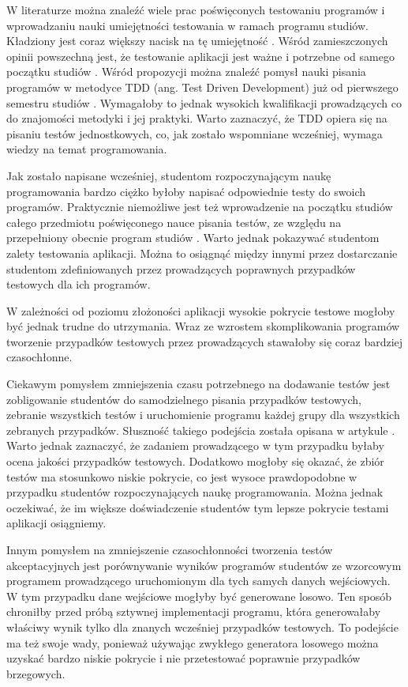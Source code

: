 W literaturze można znaleźć wiele prac poświęconych testowaniu programów i wprowadzaniu nauki umiejętności testowania w ramach programu studiów.
Kładziony jest coraz większy nacisk na tę umiejętność \cite{tests-important}.
Wśród zamieszczonych opinii powszechną jest, że testowanie aplikacji jest ważne i potrzebne od samego początku studiów \cite{test-from-scratch}.
Wśród propozycji można znaleźć pomysł nauki pisania programów w metodyce TDD (ang. Test Driven Development) już od pierwszego semestru studiów \cite{tdd-on-start}.
Wymagałoby to jednak wysokich kwalifikacji prowadzących co do znajomości metodyki i jej praktyki.
Warto zaznaczyć, że TDD opiera się na pisaniu testów jednostkowych, co, jak zostało wspomniane wcześniej, wymaga wiedzy na temat programowania.

Jak zostało napisane wcześniej, studentom rozpoczynającym naukę programowania bardzo ciężko byłoby napisać odpowiednie testy do swoich programów.
Praktycznie niemożliwe jest też wprowadzenie na początku studiów całego przedmiotu poświęconego nauce pisania testów, ze względu na przepełniony obecnie program studiów \cite{overflow-studies-program}.
Warto jednak pokazywać studentom zalety testowania aplikacji.
Można to osiągnąć między innymi przez dostarczanie studentom zdefiniowanych przez prowadzących poprawnych przypadków testowych dla ich programów.

W zależności od poziomu złożoności aplikacji wysokie pokrycie testowe mogłoby być jednak trudne do utrzymania.
Wraz ze wzrostem skomplikowania programów tworzenie przypadków testowych przez prowadzących stawałoby się coraz bardziej czasochłonne.

Ciekawym pomysłem zmniejszenia czasu potrzebnego na dodawanie testów jest zobligowanie studentów do samodzielnego pisania przypadków testowych, zebranie wszystkich testów i uruchomienie programu każdej grupy dla wszystkich zebranych przypadków. 
Słuszność takiego podejścia została opisana w artykule \cite{write-tests-by-students}.
Warto jednak zaznaczyć, że zadaniem prowadzącego w tym przypadku byłaby ocena jakości przypadków testowych.
Dodatkowo mogłoby się okazać, że zbiór testów ma stosunkowo niskie pokrycie, co jest wysoce prawdopodobne w przypadku studentów rozpoczynających naukę programowania.
Można jednak oczekiwać, że im większe doświadczenie studentów tym lepsze pokrycie testami aplikacji osiągniemy.

Innym pomysłem na zmniejszenie czasochłonności tworzenia testów akceptacyjnych jest porównywanie wyników programów studentów ze wzorcowym programem prowadzącego uruchomionym dla tych samych danych wejściowych.
W tym przypadku dane wejściowe mogłyby być generowane losowo.
Ten sposób chroniłby przed próbą sztywnej implementacji programu, która generowałaby właściwy wynik tylko dla znanych wcześniej przypadków testowych.
To podejście ma też swoje wady, ponieważ używając zwykłego generatora losowego można uzyskać bardzo niskie pokrycie i nie przetestować poprawnie przypadków brzegowych.

